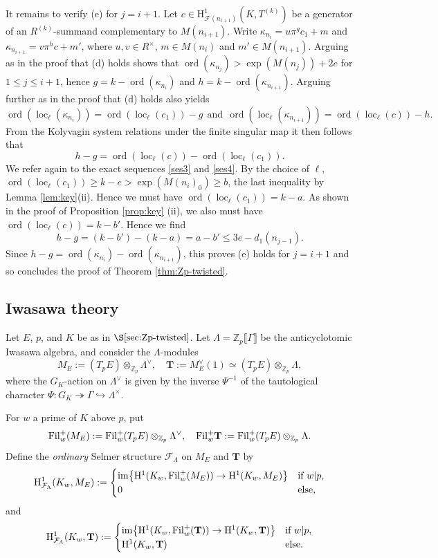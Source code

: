 \documentclass[10pt]{amsart}
\numberwithin{equation}{section}
\theoremstyle{definition}
\theoremstyle{remark}
\newcommand{\Z}{\mathbb{Z}}
\newcommand{\Fcal}{\mathcal{F}}
\newcommand{\rH}{\mathrm{H}}
\DeclareMathOperator{\loc}{loc}
\DeclareMathOperator{\ord}{ord}
\newcommand{\CF}{\mathcal{F}}
\newcommand{\kap}{\kappa}
\begin{document}
It remains to verify (e) for $j=i+1$. Let $c\in \rH^1_{\CF(n_{i+1})}(K,T^{(k)})$ be a generator of an $R^{(k)}$-summand
complementary to $M(n_{i+1})$. 
Write $\kap_{n_i} = u\pi^g c_1 + m$ and $\kap_{n_{i+1}} = v\pi^h c + m'$, where $u,v\in R^\times$, $m\in M(n_{i})$ and $m'\in M(n_{i+1})$. Arguing as in the proof that (d) holds shows that 
$\ord(\kap_{n_j})> \exp(M(n_j))+2e$ for $1\leqslant j\leqslant i+1$, hence 
$g = k - \ord(\kap_{n_i})$ and $h = k - \ord(\kap_{n_{i+1}})$.
Arguing further as in the proof that (d) holds also yields
$$
\ord(\loc_\ell(\kap_{n_i}))  = \ord(\loc_\ell(c_1))-g \ \ \text{and} \ \  \ord(\loc_\ell(\kap_{n_{i+1}})) = \ord(\loc_\ell(c))-h.
$$
From the Kolyvagin system relations under the finite singular map it then follows that
$$
h-g = \ord(\loc_\ell(c))-\ord(\loc_\ell(c_1)).
$$
We refer again to the exact sequences \eqref{ses3} and \eqref{ses4}.
By the choice of $\ell$, 
$\ord(\loc_\ell(c_1))\geqslant k-e> \exp(M(n_i)_0)\geq b$, the last inequality by Lemma \ref{lem:key}(ii). Hence we must have 
$\ord(\loc_\ell(c_1))=k-a$. As shown in the proof of Proposition \ref{prop:key} (ii), we also must have $\ord(\loc_\ell(c))=k-b'$. Hence we find
$$
h-g =  (k-b')-(k-a) = a-b' \leqslant 3e -d_1(n_{j-1}).
$$
Since $h-g = \ord(\kap_{n_i})-\ord(\kap_{n_{i+1}})$, this proves (e) holds for $j=i+1$ and so concludes the proof of 
Theorem \ref{thm:Zp-twisted}.






\subsection{Iwasawa theory} 
\label{subsec:Iw-proof}

Let $E$, $p$, and $K$ be as in $\S\ref{sec:Zp-twisted}$. Let $\Lambda=\Z_p\llbracket\Gamma\rrbracket$ be the anticyclotomic Iwasawa algebra, and consider the $\Lambda$-modules
\[
M_E:=(T_pE)\otimes_{\Z_p}\Lambda^\vee,\quad
\mathbf{T}:=M_E^\vee(1)\simeq(T_pE)\otimes_{\Z_p}\Lambda,
\]
where the $G_K$-action on $\Lambda^\vee$ is given by the inverse $\Psi^{-1}$ of the tautological character $\Psi: G_K\twoheadrightarrow\Gamma\hookrightarrow\Lambda^\times$.

For $w$ a prime of $K$ above $p$, put
\[
{\rm Fil}_w^+(M_E):={\rm Fil}_w^+(T_pE)\otimes_{\Z_p}\Lambda^\vee,\quad
{\rm Fil}_w^+\mathbf{T}:={\rm Fil}_w^+(T_pE)\otimes_{\Z_p}\Lambda.
\]
Define the \emph{ordinary} Selmer structure $\Fcal_\Lambda$ on $M_E$ and $\mathbf{T}$ by 
\[
\rH^1_{\Fcal_\Lambda}(K_w,M_E):=
\begin{cases}
{\rm im}\bigl\{\rH^1(K_w,{\rm Fil}_w^+(M_E))\rightarrow\rH^1(K_w,M_E)\bigr\} & \textrm{if $w\vert p$,}\\
0& \textrm{else,}
\end{cases}
\]
and
\[
\rH^1_{\Fcal_\Lambda}(K_w,\mathbf{T}):=
\begin{cases}
{\rm im}\bigl\{\rH^1(K_w,{\rm Fil}_w^+(\mathbf{T}))\rightarrow\rH^1(K_w,\mathbf{T})\bigr\} & \textrm{if $w\vert p$,}\\
\rH^1(K_w,\mathbf{T})& \textrm{else.}
\end{cases}
\]
\end{document}
